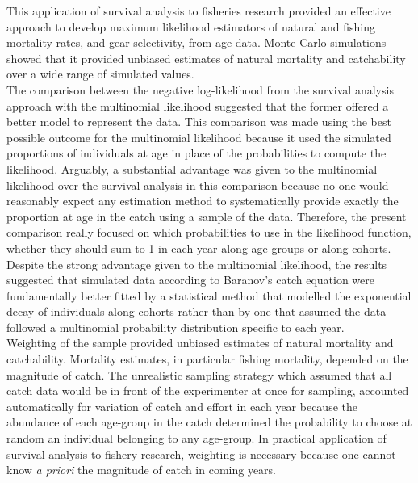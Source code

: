 This application of survival analysis to fisheries research provided an effective approach to develop maximum likelihood estimators of natural and fishing mortality rates, and gear selectivity, from age data. Monte Carlo simulations showed that it provided unbiased estimates of natural mortality and catchability over a wide range of simulated values. \\

The comparison between the negative log-likelihood from the survival analysis approach with the multinomial likelihood \citep{Four82a} suggested that the former offered a better model to represent the data. This comparison was made using the best possible outcome for the multinomial likelihood because it used the simulated proportions of individuals at age in place of the probabilities to compute the likelihood. Arguably, a substantial advantage was given to the multinomial likelihood over the survival analysis in this comparison because no one would reasonably expect any estimation method to systematically provide exactly the proportion at age in the catch using a sample of the data. Therefore, the present comparison really focused on which probabilities to use in the likelihood function, whether they should sum to 1 in each year along age-groups or along cohorts. Despite the strong advantage given to the multinomial likelihood, the results suggested that simulated data according to Baranov's catch equation were fundamentally better fitted by a statistical method that modelled the exponential decay of individuals along cohorts rather than by one that assumed the data followed a multinomial probability distribution specific to each year.\\

Weighting of the sample provided unbiased estimates of natural mortality and catchability. Mortality estimates, in particular fishing mortality, depended on the magnitude of catch. The unrealistic sampling strategy which assumed that all catch data would be in front of the experimenter at once for sampling, accounted automatically for variation of catch and effort in each year because the abundance of each age-group in the catch determined the probability to choose at random an individual belonging to any age-group. In practical application of survival analysis to fishery research, weighting is necessary because one cannot know {\it a priori} the magnitude of catch in coming years. \\


